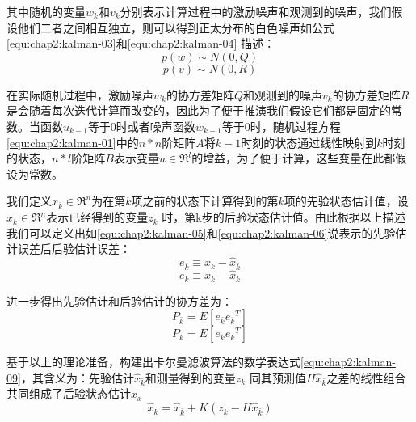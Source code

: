 \par 其中随机的变量$w_{k}$和$v_{k}$分别表示计算过程中的激励噪声和观测到的噪声，我们假设他们二者之间相互独立，则可以得到正太分布的白色噪声如公式\ref{equ:chap2:kalman-03}和\ref{equ:chap2:kalman-04} 描述：
\begin{equation}
\label{equ:chap2:kalman-03}
  p(w)\sim N(0,Q)
\end{equation}
\begin{equation}
\label{equ:chap2:kalman-04}
  p(v)\sim N(0,R)
\end{equation}
\par 在实际随机过程中，激励噪声$w_{k}$的协方差矩阵$Q$和观测到的噪声$v_{k}$的协方差矩阵$R$是会随着每次迭代计算而改变的，因此为了便于推演我们假设它们都是固定的常数。当函数$u_{k-1}$等于0时或者噪声函数$w_{k-1}$等于0时，随机过程方程\ref{equ:chap2:kalman-01}中的$n*n$阶矩阵$A$将$k-1$时刻的状态通过线性映射到$k$时刻的状态，$n*l$阶矩阵$B$表示变量$u\in \Re^{l}$的增益，为了便于计算，这些变量在此都假设为常数。
\par 我们定义$\hat{x}_{\bar{k}} \in \Re^{n}$为在第$k$项之前的状态下计算得到的第$k$项的先验状态估计值，设$\hat{x}_{k} \in \Re^{n}$表示已经得到的变量$z_{k}$ 时，第k步的后验状态估计值。由此根据以上描述我们可以定义出如\ref{equ:chap2:kalman-05}和\ref{equ:chap2:kalman-06}说表示的先验估计误差后后验估计误差：
\begin{equation}
\label{equ:chap2:kalman-05}
  e_{\bar{k}}\equiv x_{k}-\hat{x}_{\bar{k}}
\end{equation}
\begin{equation}
\label{equ:chap2:kalman-06}
  e_{k}\equiv x_{k}-\hat{x}_{k}
\end{equation}
\par 进一步得出先验估计和后验估计的协方差为：
\begin{equation}
\label{equ:chap2:kalman-07}
P_{\bar{k}}=E\left [ e_{\bar{k}} {e_{\bar{k}}}^{T}  \right ]
\end{equation}
\begin{equation}
\label{equ:chap2:kalman-08}
P_{k}=E\left [ e_{k} {e_{k}}^{T}  \right ]
\end{equation}
\par 基于以上的理论准备，构建出卡尔曼滤波算法的数学表达式\ref{equ:chap2:kalman-09}，其含义为：先验估计$\hat{x}_{\bar{k}}$和测量得到的变量$z_{k}$ 同其预测值$H\hat{x}_{\bar{k}}$之差的线性组合共同组成了后验状态估计$\hat{x}_{x}$
\begin{equation}
\label{equ:chap2:kalman-09}
\hat{x}_{k}=\hat{x}_{\bar{k}} + K(z_{k}-H\hat{x}_{\bar{k}})
\end{equation}
